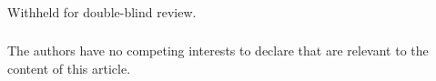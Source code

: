 \documentclass[runningheads]{llncs}
\begin{document}
\begin{credits}
\subsubsection{\ackname}
Withheld for double-blind review.

\subsubsection{\discintname}
The authors have no competing interests to declare that are relevant to the
content of this article.
\end{credits}

\begingroup
\sloppy


\endgroup
\end{document}
